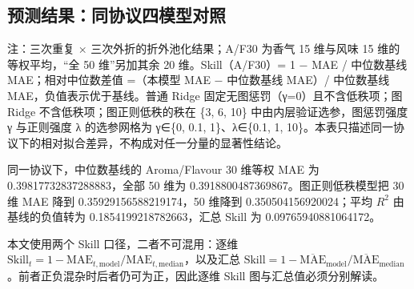 \documentclass[11pt,a4paper]{article}
\newenvironment{bptable}{%
  \par\medskip\noindent\begin{minipage}{\linewidth}\centering
}{%
  \end{minipage}\par\medskip
}
\newenvironment{tablenote}{%
  \par\smallskip\noindent\footnotesize
  \setlength{\parindent}{0pt}\setlength{\parskip}{0pt}%
  \raggedright
}{%
  \par\medskip
}
\begin{document}
\subsection{预测结果：同协议四模型对照}\label{ux9884ux6d4bux7ed3ux679cux540cux534fux8baeux56dbux6a21ux578bux5bf9ux7167}

\begin{bptable}
\setcounter{table}{0}
\label{tab:q1-models}
\par\smallskip
\small
{}%
\begin{tablenote}注：三次重复 × 三次外折的折外池化结果；A/F30 为香气 15 维与风味 15 维的等权平均，“全 50 维”另加其余 20 维。Skill（A/F30）= 1 − MAE / 中位数基线 MAE；相对中位数差值 =（本模型 MAE − 中位数基线 MAE）/ 中位数基线 MAE，负值表示优于基线。普通 Ridge 固定无图惩罚（γ=0）且不含低秩项；图 Ridge 不含低秩项；图正则低秩的秩在 \{3, 6, 10\} 中由内层验证选参，图惩罚强度 γ 与正则强度 λ 的选参网格为 γ∈\{0, 0.1, 1\}、λ∈\{0.1, 1, 10\}。本表只描述同一协议下的相对拟合差异，不构成对任一分量的显著性结论。\end{tablenote}
\end{bptable}

同一协议下，中位数基线的 Aroma/Flavour 30 维等权 MAE 为
0.39817732837288883，全部 50 维为 0.3918800487369867。图正则低秩模型把
30 维 MAE 降到 0.35929156588219174，50 维降到 0.350504156920024；平均
\(R^2\) 由基线的负值转为 0.1854199218782663，汇总 Skill 为
0.09765940881064172。

本文使用两个 Skill 口径，二者不可混用：逐维
\(\mathrm{Skill}_t=1-\mathrm{MAE}_{t,\mathrm{model}}/\mathrm{MAE}_{t,\mathrm{median}}\)，以及汇总
\(\mathrm{Skill}=1-\overline{\mathrm{MAE}}_{\mathrm{model}}/\overline{\mathrm{MAE}}_{\mathrm{median}}\)。前者正负混杂时后者仍可为正，因此逐维
Skill 图与汇总值必须分别解读。
\end{document}
